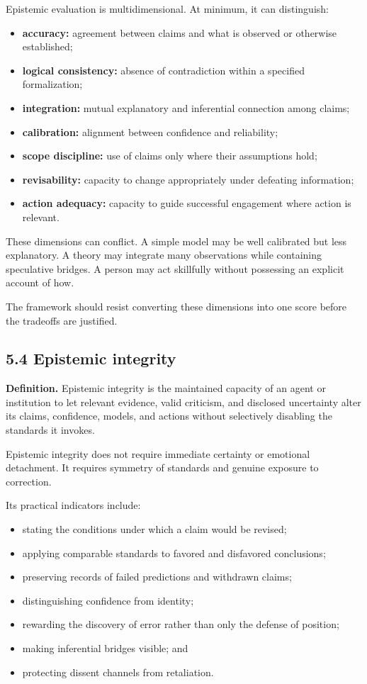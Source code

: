 \documentclass[
  11pt,
]{article}
\providecommand{\tightlist}{%
  \setlength{\itemsep}{0pt}\setlength{\parskip}{0pt}}
\begin{document}
Epistemic evaluation is multidimensional. At minimum, it can
distinguish:

\begin{itemize}
\tightlist
\item
  \textbf{accuracy:} agreement between claims and what is observed or
  otherwise established;
\item
  \textbf{logical consistency:} absence of contradiction within a
  specified formalization;
\item
  \textbf{integration:} mutual explanatory and inferential connection
  among claims;
\item
  \textbf{calibration:} alignment between confidence and reliability;
\item
  \textbf{scope discipline:} use of claims only where their assumptions
  hold;
\item
  \textbf{revisability:} capacity to change appropriately under
  defeating information;
\item
  \textbf{action adequacy:} capacity to guide successful engagement
  where action is relevant.
\end{itemize}

These dimensions can conflict. A simple model may be well calibrated but
less explanatory. A theory may integrate many observations while
containing speculative bridges. A person may act skillfully without
possessing an explicit account of how.

The framework should resist converting these dimensions into one score
before the tradeoffs are justified.

\subsection{5.4 Epistemic integrity}\label{epistemic-integrity}

\textbf{Definition.} Epistemic integrity is the maintained capacity of
an agent or institution to let relevant evidence, valid criticism, and
disclosed uncertainty alter its claims, confidence, models, and actions
without selectively disabling the standards it invokes.

Epistemic integrity does not require immediate certainty or emotional
detachment. It requires symmetry of standards and genuine exposure to
correction.

Its practical indicators include:

\begin{itemize}
\tightlist
\item
  stating the conditions under which a claim would be revised;
\item
  applying comparable standards to favored and disfavored conclusions;
\item
  preserving records of failed predictions and withdrawn claims;
\item
  distinguishing confidence from identity;
\item
  rewarding the discovery of error rather than only the defense of
  position;
\item
  making inferential bridges visible; and
\item
  protecting dissent channels from retaliation.
\end{itemize}
\end{document}
